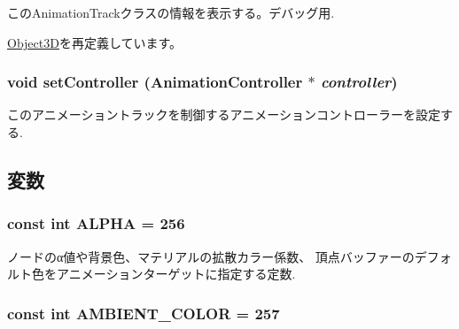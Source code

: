 このAnimationTrackクラスの情報を表示する。デバッグ用. 

\hyperlink{classm3g_1_1Object3D_6fea17fa1532df3794f8cb39cb4f911f}{Object3D}を再定義しています。\hypertarget{classm3g_1_1AnimationTrack_639279dfdc74095fcb28d0c25aeec6df}{
\subsubsection[{setController}]{\setlength{\rightskip}{0pt plus 5cm}void setController ({\bf AnimationController} $\ast$ {\em controller})}}
\label{classm3g_1_1AnimationTrack_639279dfdc74095fcb28d0c25aeec6df}


このアニメーショントラックを制御するアニメーションコントローラーを設定する. 

\subsection{変数}
\hypertarget{classm3g_1_1AnimationTrack_417581fcde4067111f47320edb2aa378}{
\subsubsection[{ALPHA}]{\setlength{\rightskip}{0pt plus 5cm}const int {\bf ALPHA} = 256}}
\label{classm3g_1_1AnimationTrack_417581fcde4067111f47320edb2aa378}


ノードのα値や背景色、マテリアルの拡散カラー係数、 頂点バッファーのデフォルト色をアニメーションターゲットに指定する定数. \hypertarget{classm3g_1_1AnimationTrack_71b6e9c23b95f8011da4565f4a12f677}{
\subsubsection[{AMBIENT\_\-COLOR}]{\setlength{\rightskip}{0pt plus 5cm}const int {\bf AMBIENT\_\-COLOR} = 257}}
\label{classm3g_1_1AnimationTrack_71b6e9c23b95f8011da4565f4a12f677}


